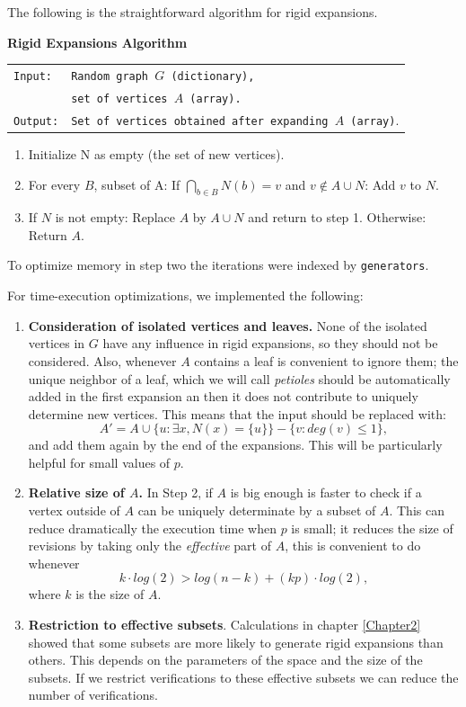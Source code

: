 The following is the straightforward algorithm for rigid expansions.

\begin{cajita}
\textbf{Rigid Expansions Algorithm} \hfill \break

\begin{tabular}{ l l }
\texttt{Input:} &  \texttt{Random graph $G$ (dictionary),} \\
                &  \texttt{set of vertices $A$ (array).}\\
\texttt{Output:} & \texttt{Set of vertices obtained after expanding $A$ (array)}.\\
\end{tabular}
\begin{enumerate}
\item Initialize N as empty (the set of new vertices).
\item For every $B$, subset of A:\hfill \break
\hphantom{12} If $\bigcap\limits_{b\in B} N(b) = v$ and $v\not\in A\cup N$: \hfill \break
\hphantom{1234} Add $v$ to $N$.
\item If $N$ is not empty: \hfill \break
\hphantom{12} Replace $A$ by $A\cup N$ and return to step 1. \hfill \break
      Otherwise:\hfill \break
\hphantom{12} Return $A$.
\end{enumerate}
\end{cajita}

To optimize memory in step two the iterations were indexed by \texttt{generators}.

For time-execution optimizations, we implemented the following:

\begin{enumerate}
\item \textbf{Consideration of isolated vertices and leaves.} None of the isolated vertices in $G$ have any influence in rigid expansions, so they should not be considered. Also, whenever $A$ contains a leaf is convenient to ignore them; the unique neighbor of a leaf, which we will call \textit{petioles} should be automatically added in the first expansion an then it does not contribute to uniquely determine new vertices. This means that the input should be replaced with:
$$A' = A \cup \{u: \exists x, N(x)=\{u\}\} - \{v: deg(v)\leq 1 \},$$
and add them again by the end of the expansions. This will be particularly helpful for small values of $p$.
\item \textbf{Relative size of $A$.} In Step 2, if $A$ is big enough is faster to check if a vertex outside of $A$ can be uniquely determinate by a subset of $A$. This can reduce dramatically the execution time when $p$ is small; it reduces the size of revisions by taking only the \textit{effective} part of $A$, this is convenient to do whenever
$$k\cdot log(2) > log(n-k) + (kp)\cdot log(2),$$
where $k$ is the size of $A$.

\item \textbf{Restriction to effective subsets}. Calculations in chapter \ref{Chapter2} showed that some subsets are more likely to generate rigid expansions than others. This depends on the parameters of the space and the size of the subsets. If we restrict verifications to these effective subsets we can reduce the number of verifications.
\end{enumerate}

